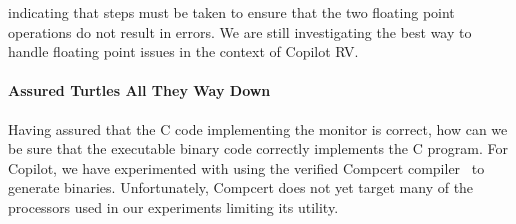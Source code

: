 indicating that steps must be taken to ensure that the two floating
point operations do not result in errors. We are still investigating
the best way to  handle floating point issues in the context of
Copilot RV.


\paragraph{Assured Turtles  All They Way Down} 
Having assured that the C code implementing the monitor is correct,
how can we be sure that the executable binary code correctly
implements the C program. For Copilot, we have experimented
with using the verified Compcert compiler~\cite{leroy} to generate
binaries.  Unfortunately, Compcert does not yet target many of the
processors used in our experiments limiting its utility.


